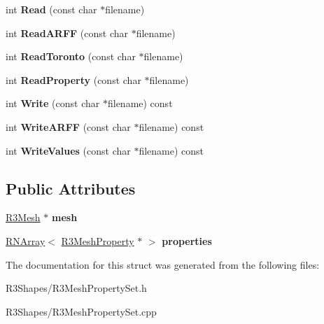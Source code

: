 \begin{DoxyCompactItemize}
\item 
int {\bfseries Read} (const char $\ast$filename)\hypertarget{struct_r3_mesh_property_set_a52aa57c56ba27e654bb98a6966775fcc}{}\label{struct_r3_mesh_property_set_a52aa57c56ba27e654bb98a6966775fcc}

\item 
int {\bfseries Read\+A\+R\+FF} (const char $\ast$filename)\hypertarget{struct_r3_mesh_property_set_a23be501fa14ccf0433b42a237f79a543}{}\label{struct_r3_mesh_property_set_a23be501fa14ccf0433b42a237f79a543}

\item 
int {\bfseries Read\+Toronto} (const char $\ast$filename)\hypertarget{struct_r3_mesh_property_set_a1f1a24103f523a9f16fc87514acde2e9}{}\label{struct_r3_mesh_property_set_a1f1a24103f523a9f16fc87514acde2e9}

\item 
int {\bfseries Read\+Property} (const char $\ast$filename)\hypertarget{struct_r3_mesh_property_set_ab001e891cb516b1729d981f6dc210982}{}\label{struct_r3_mesh_property_set_ab001e891cb516b1729d981f6dc210982}

\item 
int {\bfseries Write} (const char $\ast$filename) const \hypertarget{struct_r3_mesh_property_set_a69b963f9e160e2a2e9e18f08845c5315}{}\label{struct_r3_mesh_property_set_a69b963f9e160e2a2e9e18f08845c5315}

\item 
int {\bfseries Write\+A\+R\+FF} (const char $\ast$filename) const \hypertarget{struct_r3_mesh_property_set_a35a1fd7f9d7a6a05922b5444ed5b78ab}{}\label{struct_r3_mesh_property_set_a35a1fd7f9d7a6a05922b5444ed5b78ab}

\item 
int {\bfseries Write\+Values} (const char $\ast$filename) const \hypertarget{struct_r3_mesh_property_set_a6bad709674455fff2889fc50d9aa9f43}{}\label{struct_r3_mesh_property_set_a6bad709674455fff2889fc50d9aa9f43}

\end{DoxyCompactItemize}
\subsection*{Public Attributes}
\begin{DoxyCompactItemize}
\item 
\hyperlink{class_r3_mesh}{R3\+Mesh} $\ast$ {\bfseries mesh}\hypertarget{struct_r3_mesh_property_set_ab331ed50bcc3db6f00d327730dadfef4}{}\label{struct_r3_mesh_property_set_ab331ed50bcc3db6f00d327730dadfef4}

\item 
\hyperlink{class_r_n_array}{R\+N\+Array}$<$ \hyperlink{struct_r3_mesh_property}{R3\+Mesh\+Property} $\ast$ $>$ {\bfseries properties}\hypertarget{struct_r3_mesh_property_set_af202ee0f3f569874b1b95d27f7c2ec0b}{}\label{struct_r3_mesh_property_set_af202ee0f3f569874b1b95d27f7c2ec0b}

\end{DoxyCompactItemize}


The documentation for this struct was generated from the following files\+:\begin{DoxyCompactItemize}
\item 
R3\+Shapes/R3\+Mesh\+Property\+Set.\+h\item 
R3\+Shapes/R3\+Mesh\+Property\+Set.\+cpp\end{DoxyCompactItemize}

